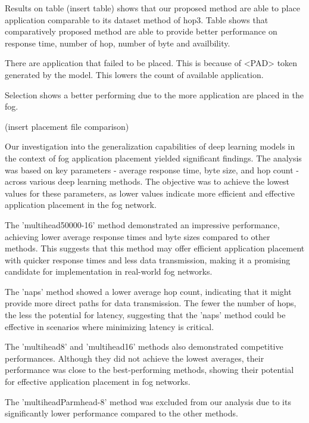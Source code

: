 \documentclass[conference]{IEEEtran}
\begin{document}

Results on table (insert table) shows that our proposed method are able to place application comparable to its dataset method of hop3. Table shows that comparatively proposed method are able to provide better performance on response time, number of hop, number of byte and availbility. 

There are application that failed to be placed. This is because of <PAD> token generated by the model. This lowers the count of available application. 

Selection shows a better performing due to the more application are placed in the fog. 

(insert placement file comparison)





Our investigation into the generalization capabilities of deep learning models in the context of fog application placement yielded significant findings. The analysis was based on key parameters - average response time, byte size, and hop count - across various deep learning methods. The objective was to achieve the lowest values for these parameters, as lower values indicate more efficient and effective application placement in the fog network.

The 'multihead50000-16' method demonstrated an impressive performance, achieving lower average response times and byte sizes compared to other methods. This suggests that this method may offer efficient application placement with quicker response times and less data transmission, making it a promising candidate for implementation in real-world fog networks.

The 'naps' method showed a lower average hop count, indicating that it might provide more direct paths for data transmission. The fewer the number of hops, the less the potential for latency, suggesting that the 'naps' method could be effective in scenarios where minimizing latency is critical.

The 'multihead8' and 'multihead16' methods also demonstrated competitive performances. Although they did not achieve the lowest averages, their performance was close to the best-performing methods, showing their potential for effective application placement in fog networks.

The 'multiheadParmhead-8' method was excluded from our analysis due to its significantly lower performance compared to the other methods.
\end{document}
